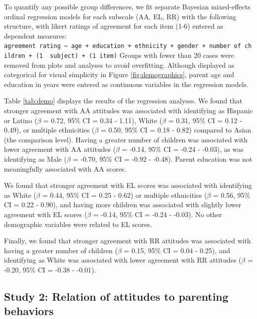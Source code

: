 \documentclass[floatsintext,man]{apa6}
\theoremstyle{definition}
\theoremstyle{definition}
\theoremstyle{definition}
\theoremstyle{remark}
\begin{document}
To quantify any possible group differences, we fit separate Bayesian
mixed-effects ordinal regression models for each subscale (AA, EL, RR)
with the following structure, with likert ratings of agreement for each
item (1-6) entered as dependent measures:
\texttt{agreement\ rating\ \textasciitilde{}\ age\ +\ education\ +\ ethnicity\ +\ gender\ +\ number\ of\ children\ +\ (1\ \textbar{}\ subject)\ +\ (1\textbar{}\ item)}
Groups with fewer than 20 cases were removed from plots and analyses to
avoid overfitting. Although displayed as categorical for visual
simplicity in Figure \ref{fig:demographics}, parent age and education in
years were entered as continuous variables in the regression models.

Table \ref{tab:demo} displays the results of the regression analyses. We
found that stronger agreement with AA attitudes was associated with
identifying as Hispanic or Latino (\(\beta\) = 0.72, 95\% CI = 0.34 -
1.11), White (\(\beta\) = 0.31, 95\% CI = 0.12 - 0.49), or multiple
ethnicities (\(\beta\) = 0.50, 95\% CI = 0.18 - 0.82) compared to Asian
(the comparison level). Having a greater number of children was
associated with lower agreement with AA attitudes (\(\beta\) = -0.14,
95\% CI = -0.24 - -0.03), as was identifying as Male (\(\beta\) = -0.70,
95\% CI = -0.92 - -0.48). Parent education was not meaningfully
associated with AA scores.

We found that stronger agreement with EL scores was associated with
identifying as White (\(\beta\) = 0.44, 95\% CI = 0.25 - 0.62) or
multiple ethnicities (\(\beta\) = 0.56, 95\% CI = 0.22 - 0.90), and
having more children was associated with slightly lower agreement with
EL scores (\(\beta\) = -0.14, 95\% CI = -0.24 - -0.03). No other
demographic variables were related to EL scores.

Finally, we found that stronger agreement with RR attitudes was
associated with having a greater number of children (\(\beta\) = 0.15,
95\% CI = 0.04 - 0.25), and identifying as White was associated with
lower agreement with RR attitudes (\(\beta\) = -0.20, 95\% CI = -0.38 -
-0.01).

\subsection{Study 2: Relation of attitudes to parenting
behaviors}\label{study-2-relation-of-attitudes-to-parenting-behaviors}
\end{document}

